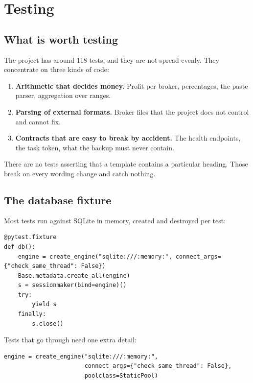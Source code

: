 \chapter{Testing}

\section{What is worth testing}

The project has around 118 tests, and they are not spread evenly. They
concentrate on three kinds of code:

\begin{enumerate}
  \item \textbf{Arithmetic that decides money.} Profit per broker, percentages,
        the paste parser, aggregation over ranges.
  \item \textbf{Parsing of external formats.} Broker files that the project does
        not control and cannot fix.
  \item \textbf{Contracts that are easy to break by accident.} The health
        endpoints, the task token, what the backup must never contain.
\end{enumerate}

There are no tests asserting that a template contains a particular heading.
Those break on every wording change and catch nothing.

\section{The database fixture}

Most tests run against SQLite in memory, created and destroyed per test:

\begin{lstlisting}[style=py]
@pytest.fixture
def db():
    engine = create_engine("sqlite:///:memory:", connect_args={"check_same_thread": False})
    Base.metadata.create_all(engine)
    s = sessionmaker(bind=engine)()
    try:
        yield s
    finally:
        s.close()
\end{lstlisting}

Tests that go through  need one extra detail:

\begin{lstlisting}[style=py]
engine = create_engine("sqlite:///:memory:",
                       connect_args={"check_same_thread": False},
                       poolclass=StaticPool)
\end{lstlisting}

